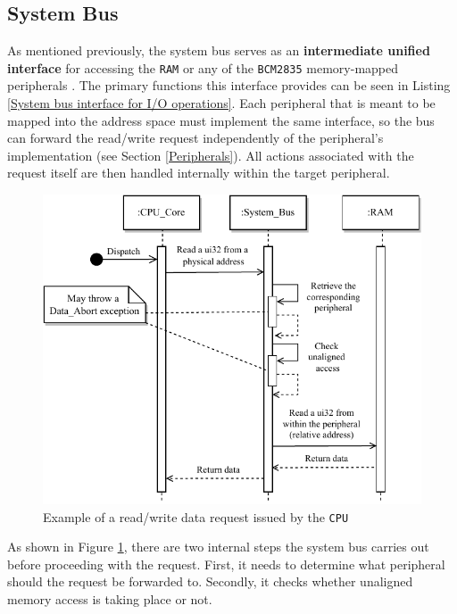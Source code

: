 \documentclass[english, ing, kiv, he, iso690numb, pdf]{fasthesis}
\begin{document}
	\newpage
	
	\subsection{System Bus} \label{System Bus}
	
	As mentioned previously, the system bus serves as an \textbf{intermediate unified interface} for accessing the \texttt{RAM} or any of the \texttt{BCM2835} memory-mapped peripherals \cite{BCM2835}. The primary functions this interface provides can be seen in Listing \ref{System bus interface for I/O operations}. Each peripheral that is meant to be mapped into the address space must implement the same interface, so the bus can forward the read/write request independently of the peripheral's implementation (see Section \ref{Peripherals}). All actions associated with the request itself are then handled internally within the target peripheral.
	
	\begin{figure}[ht]
		\centering
		\includegraphics[width=.9\textwidth]{img/diagrams/bus_sequence_diagram.pdf}
		\caption{Example of a read/write data request issued by the \texttt{CPU}}
		\label{Example of a read/write data request issued by the CPU}
	\end{figure}
	
	As shown in Figure \ref{Example of a read/write data request issued by the CPU}, there are two internal steps the system bus carries out before proceeding with the request. First, it needs to determine what peripheral should the request be forwarded to. Secondly, it checks whether unaligned memory access is taking place or not.
	
\end{document}
